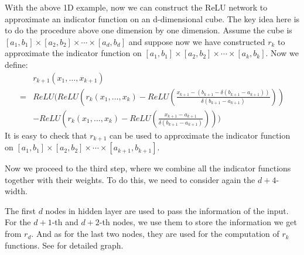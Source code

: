 With the above 1D example, now we can construct the ReLU network to approximate an indicator function on an d-dimensional cube. The key idea here is to do the procedure above one dimension by one dimension. Assume the cube is $[a_1,b_1]\times[a_2,b_2]\times\cdots\times[a_d,b_d]$ and suppose now we have constructed $r_k$ to approximate the indicator function on $[a_1,b_1]\times[a_2,b_2]\times\cdots\times[a_k,b_k]$. Now we define:
\begin{equation}
\begin{aligned}
&r_{k+1}(x_1,\dots,x_{k+1})\\
=&ReLU(ReLU(r_k(x_1,\dots,x_k)-ReLU(\frac{x_{k+1}-(b_{k+1}-\delta(b_{k+1}-a_{k+1}))}{\delta(b_{k+1}-a_{k+1})}))\\
&-ReLU(r_k(x_1,\dots,x_k)-ReLU(\frac{x_{k+1}-a_{k+1}}{\delta(b_{k+1}-a_{k+1})})))
\end{aligned}
\end{equation}
It is easy to check that $r_{k+1}$ can be used to approximate the indicator function on $[a_1,b_1]\times[a_2,b_2]\times\cdots\times[a_{k+1},b_{k+1}]$.

Now we proceed to the third step, where we combine all the indicator functions together with their weights. To do this, we need to consider again the $d+4$-width.

The first $d$ nodes in hidden layer are used to pass the information of the input. For the $d+1$-th and $d+2$-th nodes, we use them to store the information we get from $r_d$. And as for the last two nodes, they are used for the computation of $r_k$ functions. See \cite{lu2017expressive} for detailed graph.



